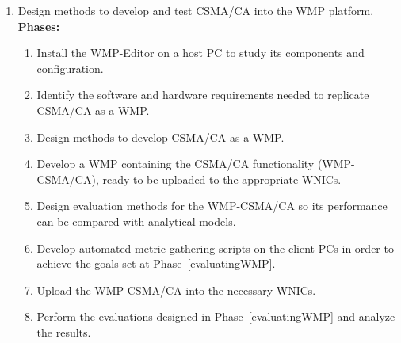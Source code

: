 \begin{enumerate}
% 	
	
	\item Design methods to develop and test CSMA/CA into the WMP platform.\label{learningWMP}\\
	
	{\bfseries Phases:}
	\begin{enumerate}
		\item Install the WMP-Editor on a host PC to study its components and configuration.\label{installWMP}
		\item Identify the software and hardware requirements needed to replicate CSMA/CA as a WMP.\label{WMPRequirements}
		\item Design methods to develop CSMA/CA as a WMP.\label{WMPCSMA-CA}
		\item Develop a WMP containing the CSMA/CA functionality (WMP-CSMA/CA), ready to be uploaded to the appropriate WNICs.
		\item Design evaluation methods for the WMP-CSMA/CA so its performance can be compared with analytical models.\label{evaluatingWMP}
		\item Develop automated metric gathering scripts on the client PCs in order to achieve the goals set at Phase~\ref{evaluatingWMP}.
		\item Upload the WMP-CSMA/CA into the necessary WNICs.
		\item Perform the evaluations designed in Phase~\ref{evaluatingWMP} and analyze the results.\label{WMPExperiment}\\
	\end{enumerate}


\end{enumerate}

